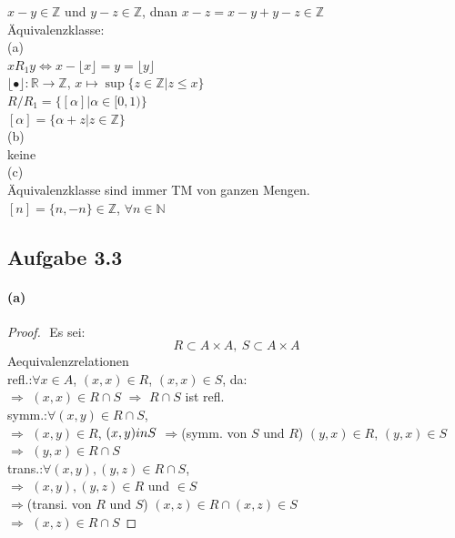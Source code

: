 $x-y\in\mathbb{Z}$ und $y-z\in\mathbb{Z}$, dnan $x-z=x-y+y-z\in\mathbb{Z}$\\

Äquivalenzklasse:\\

(a)\\
$xR_1y\Leftrightarrow x-\lfloor x\rfloor=y=\lfloor y\rfloor$\\
$\lfloor •\rfloor:\mathbb{R}\rightarrow\mathbb{Z}$, 
$x\mapsto\sup\{z\in\mathbb{Z}|z\leq x\}$\\
$R/R_1=\{[\alpha]|\alpha\in[0,1)\}$\\
$[\alpha]=\{\alpha+z|z\in\mathbb{Z}\}$\\

(b)\\
keine\\

(c)\\
Äquivalenzklasse sind immer TM von ganzen Mengen.\\
$[n]=\{n,-n\}\in\mathbb{Z}$, $\forall n\in\mathbb{N}$

\newpage

\subsection{Aufgabe 3.3}

\paragraph{(a)}
\begin{proof}
$ $\newline
Es sei:
\begin{equation*}
R\subset A\times A,\ S\subset A\times A
\end{equation*}
Aequivalenzrelationen\\

refl.:$\forall x\in A$, $(x,x)\in R$, $(x,x)\in S$, da:\\
$\Rightarrow$ $(x,x)\in R\cap S$ $\Rightarrow$ $R\cap S$ ist refl.\\

symm.:$\forall (x,y)\in R\cap S$,\\
$\Rightarrow$ $(x,y)\in R$, $(x,y)\\in S$ $\Rightarrow$(symm. von $S$ und $R$) $(y,x)\in R$, $(y,x)\in S$\\
$\Rightarrow$ $(y,x)\in R\cap S$\\

trans.:$\forall (x,y),(y,z)\in R\cap S$,\\
$\Rightarrow$ $(x,y),(y,z)\in R$ und $\in S$\\
$\Rightarrow$(transi. von $R$ und $S$) $(x,z)\in R\cap (x,z)\in S$\\
$\Rightarrow$ $(x,z)\in R\cap S$
\end{proof}

